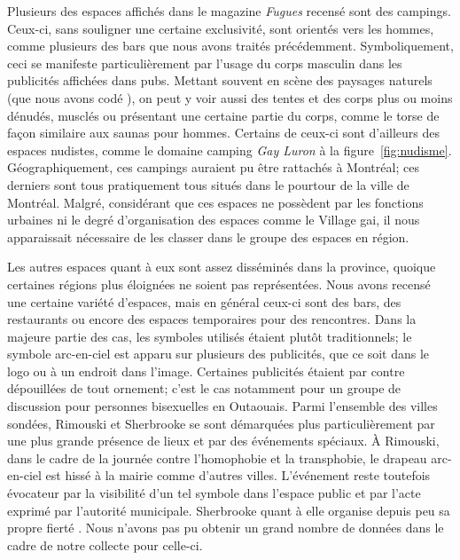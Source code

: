 Plusieurs des espaces affichés dans le magazine \emph{Fugues} recensé sont des campings.
Ceux-ci, sans souligner une certaine exclusivité, sont orientés vers les hommes, comme plusieurs des bars que nous avons traités précédemment.
Symboliquement, ceci se manifeste particulièrement par l'usage du corps masculin dans les publicités affichées dans pubs.
Mettant souvent en scène des paysages naturels (que nous avons codé ), on peut y voir aussi des tentes et des corps plus ou moins dénudés, musclés ou présentant une certaine partie du corps, comme le torse de façon similaire aux saunas pour hommes.
Certains de ceux-ci sont d'ailleurs des espaces nudistes, comme le domaine camping \emph{Gay Luron} à la figure~\ref{fig:nudisme}.
Géographiquement, ces campings auraient pu être rattachés à Montréal; ces derniers sont tous pratiquement tous situés dans le pourtour de la ville de Montréal.
Malgré, considérant que ces espaces ne possèdent par les fonctions urbaines ni le degré d'organisation des espaces comme le Village gai, il nous apparaissait nécessaire de les classer dans le groupe des espaces en région.

Les autres espaces quant à eux sont assez disséminés dans la province, quoique certaines régions plus éloignées ne soient pas représentées.
Nous avons recensé une certaine variété d'espaces, mais en général ceux-ci sont des bars, des restaurants ou encore des espaces temporaires pour des rencontres.
Dans la majeure partie des cas, les symboles utilisés étaient plutôt traditionnels; le symbole arc-en-ciel est apparu sur plusieurs des publicités, que ce soit dans le logo ou à un endroit dans l'image.
Certaines publicités étaient par contre dépouillées de tout ornement; c'est le cas notamment pour un groupe de discussion pour personnes bisexuelles en Outaouais.
Parmi l'ensemble des villes sondées, Rimouski et Sherbrooke se sont démarquées plus particulièrement par une plus grande présence de lieux et par des événements spéciaux.
À Rimouski, dans le cadre de la journée contre l'homophobie et la transphobie, le drapeau arc-en-ciel est hissé à la mairie comme d'autres villes.
L'événement reste toutefois évocateur par la visibilité d'un tel symbole dans l'espace public et par l'acte exprimé par l'autorité municipale.
Sherbrooke quant à elle organise depuis peu sa propre fierté \lgbt{}.
Nous n'avons pas pu obtenir un grand nombre de données dans le cadre de notre collecte pour celle-ci.


